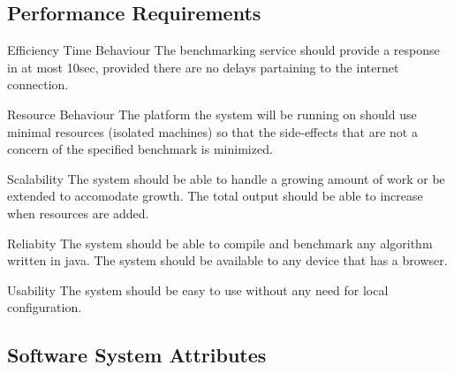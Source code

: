 \documentclass[runningheads,a4paper]{article}
\begin{document}
\subsection{Performance Requirements}
	Efficiency
		Time Behaviour 
		The benchmarking service should provide a response in at most 10sec, provided there are no delays partaining to the internet connection.
	
		Resource Behaviour
		The platform the system will be running on should use minimal resources (isolated machines) so that the side-effects that are not a concern
		of the specified benchmark is minimized.
	
	Scalability
		The system should be able to handle a growing amount of work or be extended to accomodate growth. The total output should be able to increase 
		when resources are added.

	Reliabity
		The system should be able to compile and benchmark any algorithm written in java.
		The system should be available to any device that has a browser.

	Usability
		The system should be easy to use without any need for local configuration.

\subsection{Software System Attributes}

     
     
\end{document}

